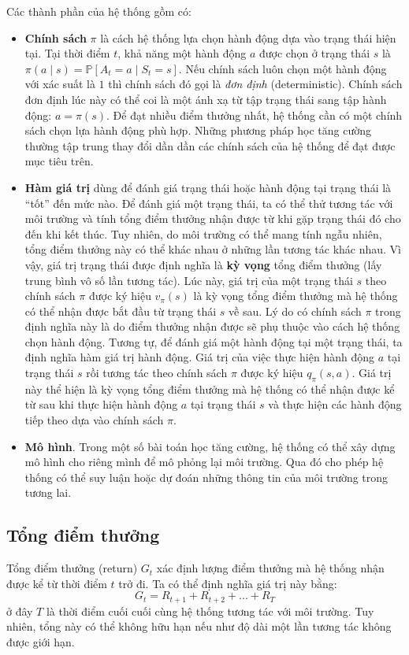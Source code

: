 Các thành phần của hệ thống gồm có:
\begin{itemize}
	\item \textbf{Chính sách} $\pi$ là cách hệ thống lựa chọn hành động dựa vào trạng thái hiện tại.
	Tại thời điểm $t$, khả năng một hành động $a$ được chọn ở trạng thái $s$ là $\pi(a \mid s) = \mathbb{P}[\mathit{A_t} = a \mid \mathit{S_t} = s]$. 
	Nếu chính sách luôn chọn một hành động với xác suất là $1$ thì chính sách đó gọi là \textit{đơn định} (deterministic).
	Chính sách đơn định lúc này có thể coi là một ánh xạ từ tập trạng thái sang tập hành động: $a = \pi(s)$.
	Để đạt nhiều điểm thưởng nhất, hệ thống cần có một chính sách chọn lựa hành động phù hợp. 
	Những phương pháp học tăng cường thường tập trung thay đổi dần dần các chính sách của hệ thống để đạt được mục tiêu trên.
	\item \textbf{Hàm giá trị} dùng để đánh giá trạng thái hoặc hành động tại trạng thái là ``tốt'' đến mức nào.
	Để đánh giá một trạng thái, ta có thể thử tương tác với môi trường và tính tổng điểm thưởng nhận được từ khi gặp trạng thái đó cho đến khi kết thúc.
	Tuy nhiên, do môi trường có thể mang tính ngẫu nhiên, tổng điểm thưởng này có thể khác nhau ở những lần tương tác khác nhau.
	Vì vậy, giá trị trạng thái được định nghĩa là \textbf{kỳ vọng} tổng điểm thưởng (lấy trung bình vô số lần tương tác).
	Lúc này, giá trị của một trạng thái $s$ theo chính sách $\pi$ được ký hiệu $v_{\pi}(s)$ là kỳ vọng tổng điểm thưởng mà hệ thống có thể nhận được bắt đầu từ trạng thái $s$ về sau.
	Lý do có chính sách $\pi$ trong định nghĩa này là do điểm thưởng nhận được sẽ phụ thuộc vào cách hệ thống chọn hành động.
	Tương tự, để đánh giá một hành động tại một trạng thái, ta định nghĩa hàm giá trị hành động.
	Giá trị của việc thực hiện hành động $a$ tại trạng thái $s$ rồi tương tác theo chính sách $\pi$ được ký hiệu $q_{\pi}(s,a)$.
	Giá trị này thể hiện là kỳ vọng tổng điểm thưởng mà hệ thống có thể nhận được kể từ sau khi thực hiện hành động $a$ tại trạng thái $s$ và thực hiện các hành động tiếp theo dựa vào chính sách $\pi$. 
	\item \textbf{Mô hình}. Trong một số bài toán học tăng cường, hệ thống có thể xây dựng mô hình cho riêng mình để mô phỏng lại môi trường. 
	Qua đó cho phép hệ thống có thể suy luận hoặc dự đoán những thông tin của môi trường trong tương lai.
\end{itemize}	

\subsection{Tổng điểm thưởng}
Tổng điểm thưởng (return) $\mathit{G_t}$ xác định lượng điểm thưởng mà hệ thống nhận được kể từ thời điểm $t$ trở đi. 
Ta có thể định nghĩa giá trị này bằng:
\begin{equation}
	\mathit{G_t} = \mathit{R_{t+1}} + \mathit{R_{t+2}} + ... + \mathit{R_{T}}
\end{equation}	
ở đây $T$ là thời điểm cuối cuối cùng hệ thống tương tác với môi trường.
Tuy nhiên, tổng này có thể không hữu hạn nếu như độ dài một lần tương tác không được giới hạn.

